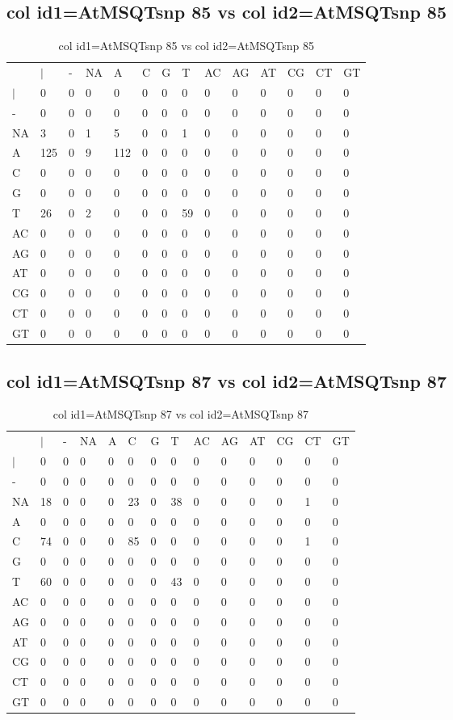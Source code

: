 \subsection{col id1=AtMSQTsnp 85 vs col id2=AtMSQTsnp 85}
\begin{center}
\begin{longtable}{|l|l|l|l|l|l|l|l|l|l|l|l|l|l|}
\caption{col id1=AtMSQTsnp 85 vs col id2=AtMSQTsnp 85} \label{table_dm970}\\
\hline
\\
\hline
&$|$&-&NA&A&C&G&T&AC&AG&AT&CG&CT&GT\\
$|$&0&0&0&0&0&0&0&0&0&0&0&0&0\\
-&0&0&0&0&0&0&0&0&0&0&0&0&0\\
NA&3&0&1&5&0&0&1&0&0&0&0&0&0\\
A&125&0&9&112&0&0&0&0&0&0&0&0&0\\
C&0&0&0&0&0&0&0&0&0&0&0&0&0\\
G&0&0&0&0&0&0&0&0&0&0&0&0&0\\
T&26&0&2&0&0&0&59&0&0&0&0&0&0\\
AC&0&0&0&0&0&0&0&0&0&0&0&0&0\\
AG&0&0&0&0&0&0&0&0&0&0&0&0&0\\
AT&0&0&0&0&0&0&0&0&0&0&0&0&0\\
CG&0&0&0&0&0&0&0&0&0&0&0&0&0\\
CT&0&0&0&0&0&0&0&0&0&0&0&0&0\\
GT&0&0&0&0&0&0&0&0&0&0&0&0&0\\
\hline
\end{longtable}
\end{center}

\subsection{col id1=AtMSQTsnp 87 vs col id2=AtMSQTsnp 87}
\begin{center}
\begin{longtable}{|l|l|l|l|l|l|l|l|l|l|l|l|l|l|}
\caption{col id1=AtMSQTsnp 87 vs col id2=AtMSQTsnp 87} \label{table_dm972}\\
\hline
\\
\hline
&$|$&-&NA&A&C&G&T&AC&AG&AT&CG&CT&GT\\
$|$&0&0&0&0&0&0&0&0&0&0&0&0&0\\
-&0&0&0&0&0&0&0&0&0&0&0&0&0\\
NA&18&0&0&0&23&0&38&0&0&0&0&1&0\\
A&0&0&0&0&0&0&0&0&0&0&0&0&0\\
C&74&0&0&0&85&0&0&0&0&0&0&1&0\\
G&0&0&0&0&0&0&0&0&0&0&0&0&0\\
T&60&0&0&0&0&0&43&0&0&0&0&0&0\\
AC&0&0&0&0&0&0&0&0&0&0&0&0&0\\
AG&0&0&0&0&0&0&0&0&0&0&0&0&0\\
AT&0&0&0&0&0&0&0&0&0&0&0&0&0\\
CG&0&0&0&0&0&0&0&0&0&0&0&0&0\\
CT&0&0&0&0&0&0&0&0&0&0&0&0&0\\
GT&0&0&0&0&0&0&0&0&0&0&0&0&0\\
\hline
\end{longtable}
\end{center}

